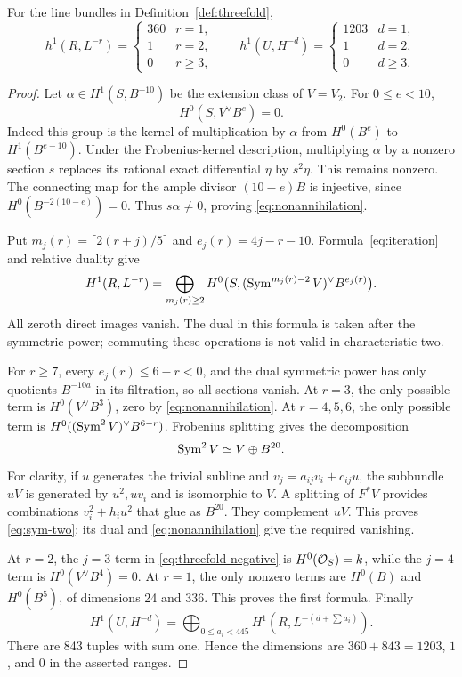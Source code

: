 \begin{lemma}\label{lem:threefold-negative}
For the line bundles in Definition~\ref{def:threefold},
\[
 h^1(R,L^{-r})=\begin{cases}360&r=1,\\1&r=2,\\0&r\ge3,\end{cases}
 \qquad
 h^1(U,H^{-d})=\begin{cases}1203&d=1,\\1&d=2,\\0&d\ge3.\end{cases}
\]
\end{lemma}
\begin{proof}
Let $\alpha\in H^1(S,B^{-10})$ be the extension class of $V=V_2$. For $0\le e<10$,
\begin{equation}\label{eq:nonannihilation}
 H^0(S,V^\vee B^e)=0.
\end{equation}
Indeed this group is the kernel of multiplication by $\alpha$ from $H^0(B^e)$ to $H^1(B^{e-10})$. Under the Frobenius-kernel description, multiplying $\alpha$ by a nonzero section $s$ replaces its rational exact differential $\eta$ by $s^2\eta$. This remains nonzero. The connecting map for the ample divisor $(10-e)B$ is injective, since $H^0(B^{-2(10-e)})=0$. Thus $s\alpha\ne0$, proving \eqref{eq:nonannihilation}.

Put $m_j(r)=\lceil2(r+j)/5\rceil$ and $e_j(r)=4j-r-10$. Formula~\eqref{eq:iteration} and relative duality give
\begin{equation}\label{eq:threefold-negative}
 H^1(R,L^{-r})=
 \bigoplus_{m_j(r)\ge2}
 H^0\bigl(S,(\operatorname{Sym}^{m_j(r)-2}V)^\vee B^{e_j(r)}\bigr).
\end{equation}
All zeroth direct images vanish. The dual in this formula is taken after the symmetric power; commuting these operations is not valid in characteristic two.

For $r\ge7$, every $e_j(r)\le6-r<0$, and the dual symmetric power has only quotients $B^{-10a}$ in its filtration, so all sections vanish. At $r=3$, the only possible term is $H^0(V^\vee B^3)$, zero by \eqref{eq:nonannihilation}. At $r=4,5,6$, the only possible term is $H^0((\operatorname{Sym}^2V)^\vee B^{6-r})$. Frobenius splitting gives the decomposition
\begin{equation}\label{eq:sym-two}
 \operatorname{Sym}^2V\simeq V\oplus B^{20}.
\end{equation}
For clarity, if $u$ generates the trivial subline and $v_j=a_{ij}v_i+c_{ij}u$, the subbundle $uV$ is generated by $u^2,uv_i$ and is isomorphic to $V$. A splitting of $F^*V$ provides combinations $v_i^2+h_i u^2$ that glue as $B^{20}$. They complement $uV$. This proves \eqref{eq:sym-two}; its dual and \eqref{eq:nonannihilation} give the required vanishing.

At $r=2$, the $j=3$ term in \eqref{eq:threefold-negative} is $H^0(\mathcal O_S)=k$, while the $j=4$ term is $H^0(V^\vee B^4)=0$. At $r=1$, the only nonzero terms are $H^0(B)$ and $H^0(B^5)$, of dimensions 24 and 336. This proves the first formula. Finally
\[
 H^1(U,H^{-d})=
 \bigoplus_{0\le a_i<445}H^1(R,L^{-(d+\sum a_i)}).
\]
There are 843 tuples with sum one. Hence the dimensions are $360+843=1203$, $1$, and $0$ in the asserted ranges.
\end{proof}

